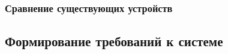 \subsubsection{Сравнение существующих устройств}



\subsection{Формирование требований к системе}


